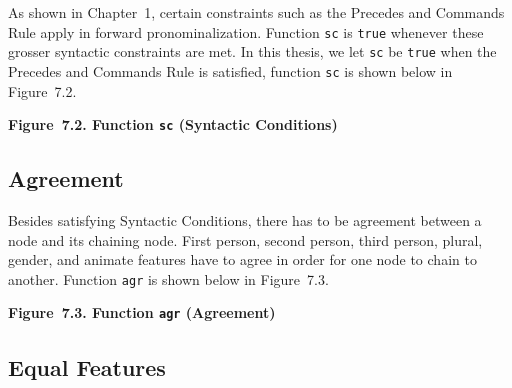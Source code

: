 \documentclass{article}
\begin{document}
As shown in Chapter~1, certain constraints such as the Precedes
and Commands Rule apply in forward pronominalization.  Function
\texttt{sc} is \texttt{true} whenever these grosser syntactic
constraints are met. In this thesis, we let \texttt{sc} be
\texttt{true} when the Precedes and Commands Rule is satisfied,
function \texttt{sc} is shown below in Figure~7.2.

\bigbreak
\begin{minipage}{\textwidth}
\vbox{}
\bigbreak
{}
\textbf{Figure~7.2. Function \texttt{sc} (Syntactic Conditions)}
\end{minipage}
\bigbreak


\subsection{Agreement}

Besides satisfying Syntactic Conditions, there has to be
agreement between a node and its chaining node. First person,
second person, third person, plural, gender, and animate
features have to agree in order for one node to chain to
another. Function \texttt{agr} is shown below in Figure~7.3.

\bigbreak
\begin{minipage}{\textwidth}
\vbox{}
\bigbreak
{}
\textbf{Figure~7.3. Function \texttt{agr} (Agreement)}
\end{minipage}
\bigbreak


\subsection{Equal Features}
\end{document}
